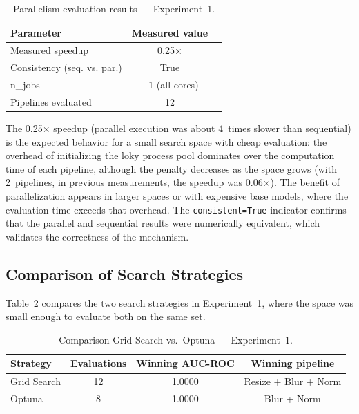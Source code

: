 \documentclass[conference]{IEEEtran}
\begin{document}
\begin{table}[t]
\centering
\renewcommand{\arraystretch}{1.2}
\caption{Parallelism evaluation results — Experiment~1.}
\label{tab:speedup}
\begin{tabular}{@{}lcc@{}}
\toprule
\textbf{Parameter} & \textbf{Measured value} \\
\midrule
Measured speedup                     & 0.25$\times$ \\
Consistency (seq. vs. par.)          & True \\
n\_jobs                              & $-1$ (all cores) \\
Pipelines evaluated                  & 12 \\
\bottomrule
\end{tabular}
\end{table}

The 0.25$\times$ speedup (parallel execution was about 4~times slower than
sequential) is the expected behavior for a small search space with cheap
evaluation: the overhead of initializing the loky process pool dominates over
the computation time of each pipeline, although the penalty decreases as the
space grows (with 2~pipelines, in previous measurements, the speedup was
0.06$\times$). The benefit of parallelization appears in larger spaces or with
expensive base models, where the evaluation time exceeds that overhead. The
\texttt{consistent=True} indicator confirms that the parallel and sequential
results were numerically equivalent, which validates the correctness of the
mechanism.

\subsection{Comparison of Search Strategies}

Table~\ref{tab:comparacion} compares the two search strategies in
Experiment~1, where the space was small enough to evaluate both on the same
set.

\begin{table}[t]
\centering
\renewcommand{\arraystretch}{1.2}
\caption{Comparison Grid Search vs.\ Optuna — Experiment~1.}
\label{tab:comparacion}
\begin{tabular}{@{}lccc@{}}
\toprule
\textbf{Strategy} & \textbf{Evaluations} & \textbf{Winning AUC-ROC} & \textbf{Winning pipeline} \\
\midrule
Grid Search & 12 & 1.0000 & Resize + Blur + Norm \\
Optuna      & 8  & 1.0000 & Blur + Norm \\
\bottomrule
\end{tabular}
\end{table}
\end{document}
